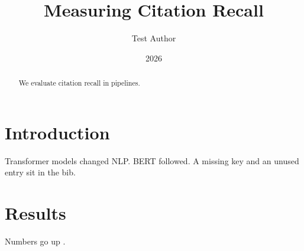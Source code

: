 \documentclass[11pt]{article}
\title{Measuring Citation Recall}
\author{Test Author}
\date{2026}
\begin{document}
\maketitle

\begin{abstract}
We evaluate citation recall \cite{devlin2019} in pipelines.
\end{abstract}

\section{Introduction}
Transformer models \citep{vaswani2017} changed NLP. BERT
\cite{devlin2019} followed. A missing key \cite{ghost2024}
and an unused entry sit in the bib.



\section{Results}
Numbers go up \cite{vaswani2017,devlin2019}.



\end{document}
